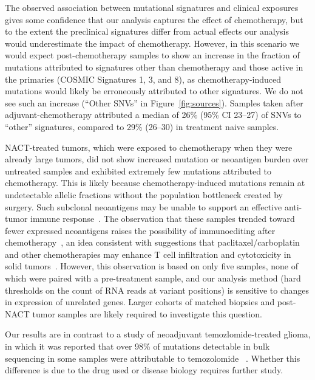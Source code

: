 The observed association between mutational signatures and clinical exposures gives some confidence that our analysis captures the effect of chemotherapy, but to the extent the preclinical signatures differ from actual effects our analysis would underestimate the impact of chemotherapy. However, in this scenario we would expect post-chemotherapy samples to show an increase in the fraction of mutations attributed to signatures other than chemotherapy and those active in the primaries (COSMIC Signatures 1, 3, and 8), as chemotherapy-induced mutations would likely be erroneously attributed to other signatures. We do not see such an increase (``Other SNVs'' in Figure~\ref{fig:sources}). Samples taken after adjuvant-chemotherapy attributed a median of 26\% (95\% CI 23--27) of SNVs to ``other'' signatures, compared to 29\% (26--30) in treatment naive samples.

NACT-treated tumors, which were exposed to chemotherapy when they were already large tumors, did not show increased mutation or neoantigen burden over untreated samples and exhibited extremely few mutations attributed to chemotherapy. This is likely because chemotherapy-induced mutations remain at undetectable allelic fractions without the population bottleneck created by surgery. Such subclonal neoantigens may be unable to support an effective anti-tumor immune response~\cite{McGranahan_2016}. The observation that these samples trended toward fewer expressed neoantigens raises the possibility of immunoediting after chemotherapy~\cite{Dunn_2002}, an idea consistent with suggestions that paclitaxel/carboplatin and other chemotherapies may enhance T cell infiltration and cytotoxicity in solid tumors~\cite{Demaria2001,Wu_2009,Pfannenstiel_2010,Hodge_2013}. However, this observation is based on only five samples, none of which were paired with a pre-treatment sample, and our analysis method (hard thresholds on the count of RNA reads at variant positions) is sensitive to changes in expression of unrelated genes. Larger cohorts of matched biopsies and post-NACT tumor samples are likely required to investigate this question.

Our results are in contrast to a study of neoadjuvant temozlomide-treated glioma, in which it was reported that over 98\% of mutations detectable in bulk sequencing in some samples were attributable to temozolomide ~\cite{Johnson_2013}. Whether this difference is due to the drug used or disease biology requires further study.


